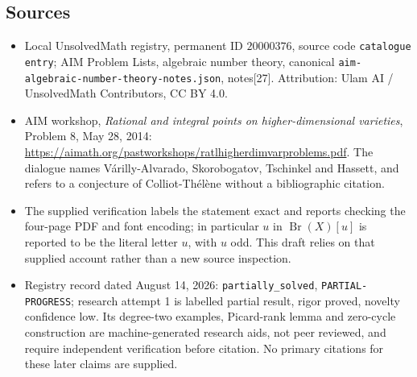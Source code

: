 \documentclass[11pt]{article}
\begin{document}
\subsection{Sources}
\begin{itemize}
\item Local UnsolvedMath registry, permanent ID \(20000376\), source code \texttt{catalogue entry}; AIM Problem Lists, algebraic number theory, canonical \texttt{aim-algebraic-number-theory-notes.json}, notes[27]. Attribution: Ulam AI / UnsolvedMath Contributors, CC BY 4.0.
\item AIM workshop, \emph{Rational and integral points on higher-dimensional varieties}, Problem 8, May 28, 2014: \url{https://aimath.org/pastworkshops/ratlhigherdimvarproblems.pdf}. The dialogue names V\'arilly-Alvarado, Skorobogatov, Tschinkel and Hassett, and refers to a conjecture of Colliot-Th\'el\`ene without a bibliographic citation.
\item The supplied verification labels the statement exact and reports checking the four-page PDF and font encoding; in particular \(u\) in \(\operatorname{Br}(X)[u]\) is reported to be the literal letter \(u\), with \(u\) odd. This draft relies on that supplied account rather than a new source inspection.
\item Registry record dated August 14, 2026: \texttt{partially\_solved}, \texttt{PARTIAL-PROGRESS}; research attempt 1 is labelled partial result, rigor proved, novelty confidence low. Its degree-two examples, Picard-rank lemma and zero-cycle construction are machine-generated research aids, not peer reviewed, and require independent verification before citation. No primary citations for these later claims are supplied.
\end{itemize}
\end{document}
